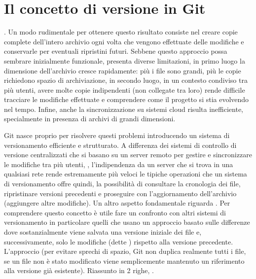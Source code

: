 \section{Il concetto di versione in Git}
\label{sec:il-concetto-di-versione-in-git}
. Un modo rudimentale per ottenere questo risultato consiste nel creare copie complete dell'intero archivio ogni volta che vengono effettuate delle modifiche e conservarle per eventuali ripristini futuri. 
Sebbene questo approccio possa sembrare inizialmente funzionale, presenta diverse limitazioni, in primo luogo la dimensione dell'archivio cresce rapidamente: più i file sono grandi, più le copie richiedono spazio di archiviazione, in secondo luogo, in un contesto condiviso tra più utenti, avere molte copie indipendenti (non collegate tra loro) rende difficile tracciare le modifiche effettuate e comprendere come il progetto si stia evolvendo nel tempo. Infine, anche la sincronizzazione su sistemi cloud risulta inefficiente, specialmente in presenza di archivi di grandi dimensioni.

Git nasce proprio per risolvere questi problemi introducendo un sistema di versionamento efficiente e strutturato. A differenza dei sistemi di controllo di versione centralizzati che si basano su un server remoto per gestire e sincronizzare le modifiche tra più utenti, , l'indipendenza da un server che si trova in una qualsiasi rete rende estremamente più veloci le tipiche operazioni che un sistema di versionamento offre quindi, la possibilità di consultare la cronologia dei file, ripristinare versioni precedenti e proseguire con l'aggiornamento dell'archivio (aggiungere altre modifiche). Un altro aspetto fondamentale riguarda . Per comprendere questo concetto è utile fare un confronto con altri sistemi di versionamento in particolare quelli che usano un approccio basato sulle differenze dove sostanzialmente viene salvata una versione iniziale dei file e, successivamente, solo le modifiche (dette ) rispetto alla versione precedente. L'approccio  (per evitare sprechi di spazio, Git non duplica realmente tutti i file, se un file non è stato modificato viene semplicemente mantenuto un riferimento alla versione già esistente). Riassunto in 2 righe, .

